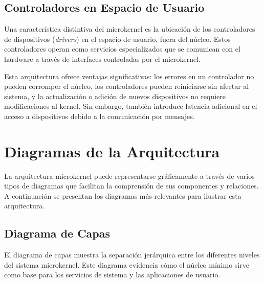 \documentclass[12pt,a4paper]{article}
\begin{document}
\subsection{Controladores en Espacio de Usuario}

Una característica distintiva del microkernel es la ubicación de los controladores de dispositivos (\textit{drivers}) en el espacio de usuario, fuera del núcleo. Estos controladores operan como servicios especializados que se comunican con el hardware a través de interfaces controladas por el microkernel.

Esta arquitectura ofrece ventajas significativas: los errores en un controlador no pueden corromper el núcleo, los controladores pueden reiniciarse sin afectar al sistema, y la actualización o adición de nuevos dispositivos no requiere modificaciones al kernel. Sin embargo, también introduce latencia adicional en el acceso a dispositivos debido a la comunicación por mensajes.

\section{Diagramas de la Arquitectura}

La arquitectura microkernel puede representarse gráficamente a través de varios tipos de diagramas que facilitan la comprensión de sus componentes y relaciones. A continuación se presentan los diagramas más relevantes para ilustrar esta arquitectura.

\subsection{Diagrama de Capas}

El diagrama de capas muestra la separación jerárquica entre los diferentes niveles del sistema microkernel. Este diagrama evidencia cómo el núcleo mínimo sirve como base para los servicios de sistema y las aplicaciones de usuario.
\end{document}
